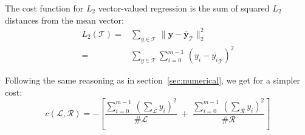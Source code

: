 The cost function for $L_2$ vector-valued regression is the sum of
squared $L_2$ distances from the mean vector: 
\begin{align*}
L_{2}\left(\mathcal{T}\right) 
= &
\sum_{y\in\mathcal{T}}\,
\|\mathbf{y}-\bar{\mathbf{y}}_{\mathcal{T}}\|_{2}^{2}\\
= &
\sum_{y\in\mathcal{T}}\sum_{i=0}^{m-1}\,
\left(y_i-\bar{y_i}_{\mathcal{T}}\right)^{2}
\end{align*}

Following the same reasoning as in section~\ref{sec:numerical}, 
we get for a simpler cost:
$$
c\left(\mathcal{L},\mathcal{R}\right) = 
-\left[
\frac{
\sum_{i=0}^{m-1} \, \left(\sum_{\mathcal{L}}y_i\right)^{2}}
{\#\mathcal{L}}
\; + \;
\frac{\sum_{i=0}^{m-1} \,
\left(\sum_{\mathcal{R}}y_i\right)^{2}}{\#\mathcal{R}}\right] 
$$

\newpage{}



